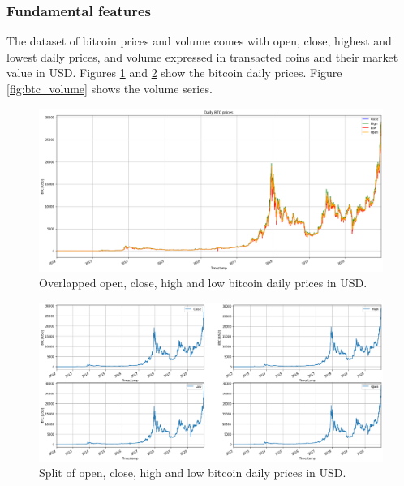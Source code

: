 \subsubsection{Fundamental features}
\label{sec:methods_features_fundamental}

The dataset of bitcoin prices and volume comes with open, close, highest and
lowest daily prices, and volume expressed in transacted coins and their market
value in USD. Figures \ref{fig:btc_prices_all} and \ref{fig:btc_prices_split}
show the bitcoin daily prices. Figure \ref{fig:btc_volume} shows the volume
series.

\begin{figure}[H]
    \centering
    \includegraphics[width=\textwidth]{methods/images/btc_prices_all.png}
    \caption{Overlapped open, close, high and low bitcoin daily prices in USD.}
    \label{fig:btc_prices_all}
\end{figure}

\begin{figure}[H]
    \centering
    \includegraphics[width=\textwidth]{methods/images/btc_prices_split.png}
    \caption{Split of open, close, high and low bitcoin daily prices in USD.}
    \label{fig:btc_prices_split}
\end{figure}

